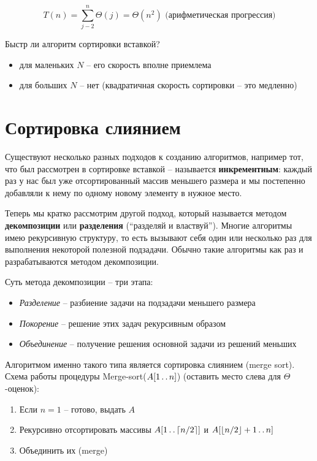 \documentclass[11pt]{article}
\begin{document}
\begin{equation*}
  T(n) = \sum_{j-2}^n{\Theta(j)} = \Theta(n^2) \text{ (арифметическая прогрессия)}
\end{equation*}

Быстр ли алгоритм сортировки вставкой? 
\begin{itemize}
\item для маленьких $N$ -- его скорость вполне приемлема
\item для больших $N$ -- нет (квадратичная скорость сортировки -- это медленно)
\end{itemize}

\section{Сортировка слиянием}

Существуют несколько разных подходов к созданию алгоритмов, например тот, что
был рассмотрен в сортировке вставкой -- называется \textbf{инкрементным}: каждый
раз у нас был уже отсортированный массив меньшего размера и мы постепенно
добавляли к нему по одному новому элементу в нужное место.

Теперь мы кратко рассмотрим другой подход, который называется методом
\textbf{декомпозиции} или \textbf{разделения} (``разделяй и властвуй''). Многие
алгоритмы имею рекурсивную структуру, то есть вызывают себя один или несколько
раз для выполнения некоторой полезной подзадачи. Обычно такие алгоритмы как раз
и разрабатываются методом декомпозиции.

Суть метода декомпозиции -- три этапа:
\begin{itemize}
\item \emph{Разделение} -- разбиение задачи на подзадачи меньшего размера
\item \emph{Покорение} -- решение этих задач рекурсивным образом
\item \emph{Объединение} -- получение решения основной задачи из решений меньших
\end{itemize}

Алгоритмом именно такого типа является сортировка слиянием (merge sort). Схема
работы процедуры Merge-sort($A[1 \mathinner{\ldotp\ldotp} n]$) (оставить место слева для
$\Theta$-оценок):

\begin{enumerate}
\item Если $n = 1$ -- готово, выдать $A$
\item Рекурсивно отсортировать массивы $A[1 \mathinner{\ldotp\ldotp} \lceil n/2 \rceil]$ и $A[\lfloor
  n/2 \rfloor+1 \mathinner{\ldotp\ldotp} n]$
\item Объединить их (merge)
\end{enumerate}
\end{document}
